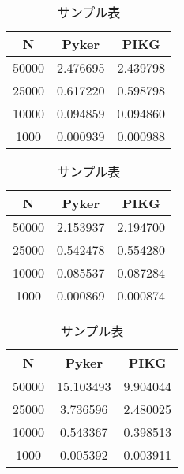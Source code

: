 \begin{table}[ht]
  \centering %
  \caption{サンプル表} %
  \label{tab:sampleTable}
  \begin{tabular}{ccc} %
  \toprule
  N & Pyker & PIKG \\
  \midrule
  50000 & 2.476695 & 2.439798\\
  25000 & 0.617220 & 0.598798\\
  10000 & 0.094859 & 0.094860\\
  1000 & 0.000939& 0.000988\\
\bottomrule
\end{tabular}
\end{table}


\begin{table}[ht]
  \centering %
  \caption{サンプル表} %
  \label{tab:sampleTable}
  \begin{tabular}{ccc} %
  \toprule
  N & Pyker & PIKG \\
  \midrule
  50000 & 2.153937 & 2.194700\\
  25000 &0.542478 & 0.554280\\
  10000 & 0.085537 &0.087284\\
  1000 & 0.000869&0.000874\\
\bottomrule
\end{tabular}
\end{table}
\begin{table}[ht]
  \centering %
  \caption{サンプル表} %
  \label{tab:sampleTable}
  \begin{tabular}{ccc} %
  \toprule
  N & Pyker & PIKG \\
  \midrule
  50000 & 15.103493& 9.904044\\
  25000 &3.736596 & 2.480025\\
  10000 &0.543367 &0.398513\\
  1000 & 0.005392&0.003911\\
\bottomrule
\end{tabular}
\end{table}